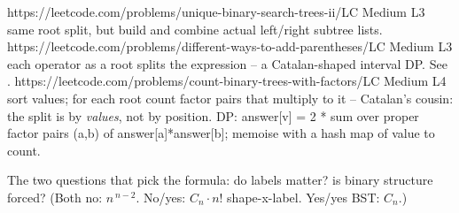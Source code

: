\begin{practiceset}
    {https://leetcode.com/problems/unique-binary-search-trees-ii/}{LC Medium L3}
    {same root split, but build and combine actual left/right subtree lists.}
    {https://leetcode.com/problems/different-ways-to-add-parentheses/}{LC Medium L3}
    {each operator as a root splits the expression -- a Catalan-shaped interval DP. See .}
    {https://leetcode.com/problems/count-binary-trees-with-factors/}{LC Medium L4}
    {sort values; for each root count factor pairs that multiply to it -- Catalan's cousin:
     the split is by \emph{values}, not by position.}
    {DP: answer[v] = 2 * sum over proper factor pairs (a,b) of answer[a]*answer[b]; memoise with a hash map of value to count.}
\end{practiceset}

\begin{recallbox}
The two questions that pick the formula: do labels matter? is binary structure forced?
(Both no: $n^{\,n-2}$. No/yes: $C_n \cdot n!$ shape-x-label. Yes/yes BST: $C_n$.)
\end{recallbox}

